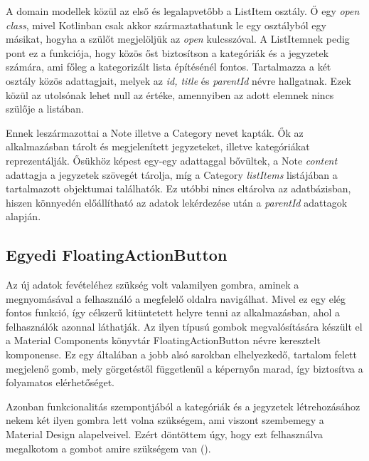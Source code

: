 A domain modellek közül az első és legalapvetőbb a ListItem osztály. Ő egy \emph{open class}, mivel Kotlinban csak akkor származtathatunk le egy osztályból egy másikat, hogyha a szülőt megjelöljük az \emph{open} kulcsszóval. A ListItemnek pedig pont ez a funkciója, hogy közös őst biztosítson a kategóriák és a jegyzetek számára, ami főleg a kategorizált lista építésénél fontos. Tartalmazza a két osztály közös adattagjait, melyek az \emph{id, title} és \emph{parentId} névre hallgatnak. Ezek közül az utolsónak lehet null az értéke, amennyiben az adott elemnek nincs szülője a listában.

Ennek leszármazottai a Note illetve a Category nevet kapták. Ők az alkalmazásban tárolt és megjelenített jegyzeteket, illetve kategóriákat reprezentálják. Ősükhöz képest egy-egy adattaggal bővültek, a Note \emph{content} adattagja a jegyzetek szövegét tárolja, míg a Category \emph{listItems} listájában a tartalmazott objektumai találhatók. Ez utóbbi nincs eltárolva az adatbázisban, hiszen könnyedén előállítható az adatok lekérdezése után a \emph{parentId} adattagok alapján.

\subsection{Egyedi FloatingActionButton}
Az új adatok fevételéhez szükség volt valamilyen gombra, aminek a megnyomásával a felhasználó a megfelelő oldalra navigálhat. Mivel ez egy elég fontos funkció, így célszerű kitüntetett helyre tenni az alkalmazásban, ahol a felhasználók azonnal láthatják. Az ilyen típusú gombok megvalósítására készült el a Material Components könyvtár FloatingActionButton névre keresztelt komponense. Ez egy általában a jobb alsó sarokban elhelyezkedő, tartalom felett megjelenő gomb, mely görgetéstől függetlenül a képernyőn marad, így biztosítva a folyamatos elérhetőséget.

Azonban funkcionalitás szempontjából a kategóriák és a jegyzetek létrehozásához nekem két ilyen gombra lett volna szükségem, ami viszont szembemegy a Material Design alapelveivel. Ezért döntöttem úgy, hogy ezt felhasználva megalkotom a gombot amire szükségem van ().

